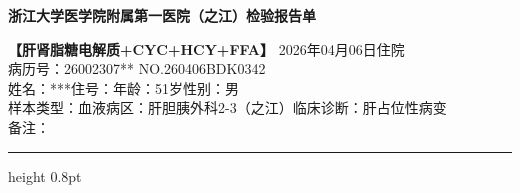 \documentclass[a4paper,11pt]{article}
\begin{document}
\begin{center}
{\LARGE\bfseries 浙江大学医学院附属第一医院（之江）检验报告单}
\end{center}

\vspace{4mm}

{\small
\textbf{【肝肾脂糖电解质+CYC+HCY+FFA】} \hfill 2026年04月06日\quad 住院 \\[1mm]
病历号：26002307** \hfill NO.260406BDK0342 \\[1mm]
姓名：***\qquad\qquad 住号：\qquad\qquad 年龄：51岁\qquad\qquad 性别：男 \\[1mm]
样本类型：血液\qquad 病区：肝胆胰外科2-3（之江）\qquad 临床诊断：肝占位性病变 \\[1mm]
备注：
}

\vspace{2mm}
\hrule height 0.8pt
\vspace{4mm}
\end{document}
